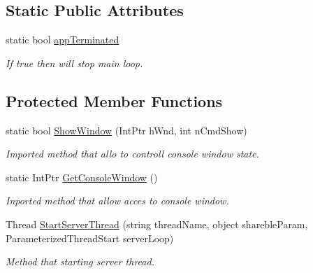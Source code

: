 \subsection*{Static Public Attributes}
\begin{DoxyCompactItemize}
\item 
static bool \mbox{\hyperlink{class_uniform_server_1_1_base_server_a632ed557976f4d7bd9b41502bb9a262b}{app\+Terminated}}
\begin{DoxyCompactList}\small\item\em If true then will stop main loop. \end{DoxyCompactList}\end{DoxyCompactItemize}
\subsection*{Protected Member Functions}
\begin{DoxyCompactItemize}
\item 
static bool \mbox{\hyperlink{class_uniform_server_1_1_base_server_a16cf4f4f9de9d6d6586631640d3d867b}{Show\+Window}} (Int\+Ptr h\+Wnd, int n\+Cmd\+Show)
\begin{DoxyCompactList}\small\item\em Imported method that allo to controll console window state. \end{DoxyCompactList}\item 
static Int\+Ptr \mbox{\hyperlink{class_uniform_server_1_1_base_server_a1b7d5587de4974fad2ec366a571791e0}{Get\+Console\+Window}} ()
\begin{DoxyCompactList}\small\item\em Inported method that allow acces to console window. \end{DoxyCompactList}\item 
Thread \mbox{\hyperlink{class_uniform_server_1_1_base_server_aa4a1412b217944e7f8d6ccae6ac68289}{Start\+Server\+Thread}} (string thread\+Name, object shareble\+Param, Parameterized\+Thread\+Start server\+Loop)
\begin{DoxyCompactList}\small\item\em Method that starting server thread. \end{DoxyCompactList}\end{DoxyCompactItemize}
